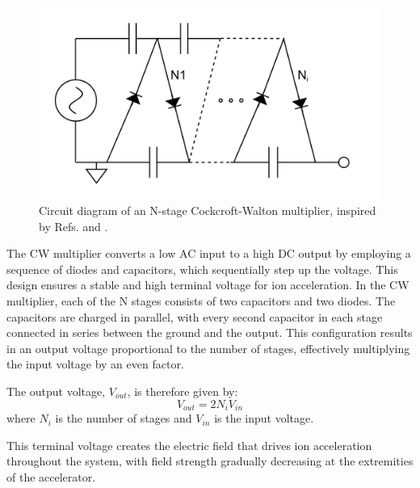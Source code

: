 \begin{figure} \centering \includegraphics[width=\linewidth]{B/cockcroftwaltercircut.pdf} \caption{Circuit diagram of an N-stage Cockcroft-Walton multiplier, inspired by Refs. \cite{cockcroftwalton} and \cite{grdjournal}.} \label{fig
} \end{figure}

The CW multiplier converts a low AC input to a high DC output by employing a sequence of diodes and capacitors, which sequentially step up the voltage. This design ensures a stable and high terminal voltage for ion acceleration.
In the CW multiplier, each of the N stages consists of two capacitors and two diodes. The capacitors are charged in parallel, with every second capacitor in each stage connected in series between the ground and the output. This configuration results in an output voltage proportional to the number of stages, effectively multiplying the input voltage by an even factor.

The output voltage, $V_{out}$, is therefore given by:
\begin{equation} V_{out} = 2 N_{i} V_{in} \end{equation}
where $N_{i}$ is the number of stages and $V_{in}$ is the input voltage.

This terminal voltage creates the electric field that drives ion acceleration throughout the system, with field strength gradually decreasing at the extremities of the accelerator.

